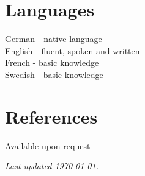 \documentclass[margin,line]{res}
\begin{document}
\begin{resume}

\section{\sc Languages} 
German - native language\\English  - fluent, spoken and written  \\French - basic knowledge \\Swedish - basic knowledge%


\section{\sc References} 
Available upon request

%
%
%
%
%

\vfill
 \hfill \emph{Last updated {\today}.}

\end{resume}
\end{document}
